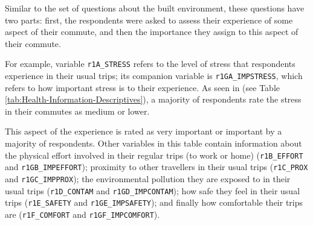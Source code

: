 \documentclass[
11pt, %
oneside, %
english, %
singlespacing, %
]{macthesis} %
\begin{document}
Similar to the set of questions about the built environment, these questions have two parts: first, the respondents were asked to assess their experience of some aspect of their commute, and then the importance they assign to this aspect of their commute.

For example, variable \texttt{r1A\_STRESS} refers to the level of stress that respondents experience in their usual trips; its companion variable is \texttt{r1GA\_IMPSTRESS}, which refers to how important stress is to their experience. As seen in (see Table \ref{tab:Health-Information-Descriptives}), a majority of respondents rate the stress in their commutes as medium or lower.

This aspect of the experience is rated as very important or important by a majority of respondents. Other variables in this table contain information about the physical effort involved in their regular trips (to work or home) (\texttt{r1B\_EFFORT} and \texttt{r1GB\_IMPEFFORT}); proximity to other travellers in their usual trips (\texttt{r1C\_PROX} and \texttt{r1GC\_IMPPROX}); the environmental pollution they are exposed to in their usual trips (\texttt{r1D\_CONTAM} and \texttt{r1GD\_IMPCONTAM}); how safe they feel in their usual trips (\texttt{r1E\_SAFETY} and \texttt{r1GE\_IMPSAFETY}); and finally how comfortable their trips are (\texttt{r1F\_COMFORT} and \texttt{r1GF\_IMPCOMFORT}).
\end{document}
